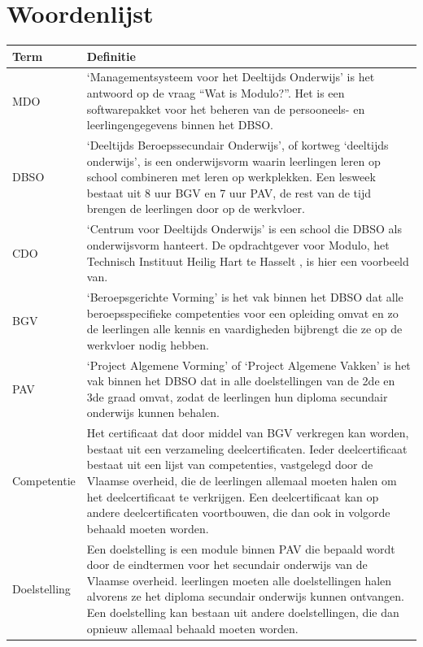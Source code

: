 \documentclass[a4paper]{article}
\begin{document}
\section{Woordenlijst} %
\def\arraystretch{1.8}
\begin{tabularx}{\textwidth}{l | X}
    Term & Definitie \\
    \hline \hline
    MDO &`Managementsysteem voor het Deeltijds Onderwijs' is het antwoord op de vraag ``Wat is Modulo?''. Het is een softwarepakket voor het beheren van de persooneels- en leerlingengegevens binnen het DBSO. \\
    \hline
    DBSO & `Deeltijds Beroepssecundair Onderwijs', of kortweg `deeltijds onderwijs', is een onderwijsvorm waarin leerlingen leren op school combineren met leren op werkplekken. Een lesweek bestaat uit 8 uur BGV en 7 uur PAV, de rest van de tijd brengen de leerlingen door op de werkvloer. \cite{DBSO} \\
    \hline
    CDO & `Centrum voor Deeltijds Onderwijs' is een school die DBSO als onderwijsvorm hanteert. De opdrachtgever voor Modulo, het Technisch Instituut Heilig Hart te Hasselt \cite{TIHH}, is hier een voorbeeld van. \cite{CDO} \\
    \hline
    BGV & `Beroepsgerichte Vorming' is het vak binnen het DBSO dat alle beroepsspecifieke competenties voor een opleiding omvat en zo de leerlingen alle kennis en vaardigheden bijbrengt die ze op de werkvloer nodig hebben. \\
    \hline
    PAV & `Project Algemene Vorming' of `Project Algemene Vakken' is het vak binnen het DBSO dat in alle doelstellingen van de 2de en 3de graad omvat, zodat de leerlingen hun diploma secundair onderwijs kunnen behalen. \\
    \hline
    Competentie & Het certificaat dat door middel van BGV verkregen kan worden, bestaat uit een verzameling deelcertificaten. Ieder deelcertificaat bestaat uit een lijst van competenties, vastgelegd door de Vlaamse overheid, die de leerlingen allemaal moeten halen om het deelcertificaat te verkrijgen. Een deelcertificaat kan op andere deelcertificaten voortbouwen, die dan ook in volgorde behaald moeten worden. \cite{Competenties} \\
    \hline
    Doelstelling & Een doelstelling is een module binnen PAV die bepaald wordt door de eindtermen voor het secundair onderwijs van de Vlaamse overheid. leerlingen moeten alle doelstellingen halen alvorens ze het diploma secundair onderwijs kunnen ontvangen. Een doelstelling kan bestaan uit andere doelstellingen, die dan opnieuw allemaal behaald moeten worden. \cite{Doelstellingen} \\
\end{tabularx}
\end{document}
